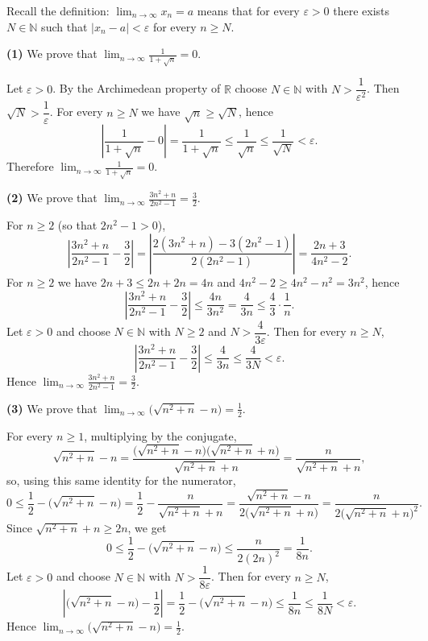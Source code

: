 \documentclass[11pt,a4paper]{article}
\newenvironment{solution}[1]{%
  \par\addvspace{1.7ex}%
  \noindent{\color{solutioncolor}\textbf{#1}}\hspace{0.55em}\ignorespaces}%
  {\par\addvspace{0.9ex}}
\begin{document}
\begin{solution}{Solution 2.1.3}\label{xs:2.1.3}
Recall the definition: $\displaystyle\lim_{n\to\infty}x_n=a$ means that for every
$\varepsilon>0$ there exists $N\in\mathbb{N}$ such that $|x_n-a|<\varepsilon$ for
every $n\ge N$.

\medskip
\noindent\textbf{(1)} We prove that
$\displaystyle\lim_{n\to\infty}\frac{1}{1+\sqrt n}=0$.

Let $\varepsilon>0$. By the Archimedean property of $\mathbb{R}$ choose
$N\in\mathbb{N}$ with $N>\dfrac{1}{\varepsilon^{2}}$. Then $\sqrt N>\dfrac1\varepsilon$.
For every $n\ge N$ we have $\sqrt n\ge\sqrt N$, hence
\[
  \left|\frac{1}{1+\sqrt n}-0\right|=\frac{1}{1+\sqrt n}
  \le\frac{1}{\sqrt n}\le\frac{1}{\sqrt N}<\varepsilon .
\]
Therefore $\displaystyle\lim_{n\to\infty}\frac{1}{1+\sqrt n}=0$.

\medskip
\noindent\textbf{(2)} We prove that
$\displaystyle\lim_{n\to\infty}\frac{3n^{2}+n}{2n^{2}-1}=\frac32$.

For $n\ge2$ (so that $2n^{2}-1>0$),
\[
  \left|\frac{3n^{2}+n}{2n^{2}-1}-\frac32\right|
  =\left|\frac{2(3n^{2}+n)-3(2n^{2}-1)}{2(2n^{2}-1)}\right|
  =\frac{2n+3}{4n^{2}-2} .
\]
For $n\ge2$ we have $2n+3\le2n+2n=4n$ and $4n^{2}-2\ge4n^{2}-n^{2}=3n^{2}$, hence
\[
  \left|\frac{3n^{2}+n}{2n^{2}-1}-\frac32\right|\le\frac{4n}{3n^{2}}
  =\frac{4}{3n}\le\frac{4}{3}\cdot\frac1n .
\]
Let $\varepsilon>0$ and choose $N\in\mathbb{N}$ with $N\ge2$ and
$N>\dfrac{4}{3\varepsilon}$. Then for every $n\ge N$,
\[
  \left|\frac{3n^{2}+n}{2n^{2}-1}-\frac32\right|\le\frac{4}{3n}
  \le\frac{4}{3N}<\varepsilon .
\]
Hence $\displaystyle\lim_{n\to\infty}\frac{3n^{2}+n}{2n^{2}-1}=\frac32$.

\medskip
\noindent\textbf{(3)} We prove that
$\displaystyle\lim_{n\to\infty}\bigl(\sqrt{n^{2}+n}-n\bigr)=\frac12$.

For every $n\ge1$, multiplying by the conjugate,
\[
  \sqrt{n^{2}+n}-n
  =\frac{\bigl(\sqrt{n^{2}+n}-n\bigr)\bigl(\sqrt{n^{2}+n}+n\bigr)}
        {\sqrt{n^{2}+n}+n}
  =\frac{n}{\sqrt{n^{2}+n}+n},
\]
so, using this same identity for the numerator,
\[
  0\le\frac12-\bigl(\sqrt{n^{2}+n}-n\bigr)
  =\frac12-\frac{n}{\sqrt{n^{2}+n}+n}
  =\frac{\sqrt{n^{2}+n}-n}{2\bigl(\sqrt{n^{2}+n}+n\bigr)}
  =\frac{n}{2\bigl(\sqrt{n^{2}+n}+n\bigr)^{2}} .
\]
Since $\sqrt{n^{2}+n}+n\ge2n$, we get
\[
  0\le\frac12-\bigl(\sqrt{n^{2}+n}-n\bigr)
  \le\frac{n}{2(2n)^{2}}=\frac{1}{8n} .
\]
Let $\varepsilon>0$ and choose $N\in\mathbb{N}$ with $N>\dfrac{1}{8\varepsilon}$.
Then for every $n\ge N$,
\[
  \left|\bigl(\sqrt{n^{2}+n}-n\bigr)-\frac12\right|
  =\frac12-\bigl(\sqrt{n^{2}+n}-n\bigr)\le\frac{1}{8n}\le\frac{1}{8N}<\varepsilon .
\]
Hence $\displaystyle\lim_{n\to\infty}\bigl(\sqrt{n^{2}+n}-n\bigr)=\frac12$.


\end{solution}
\end{document}
